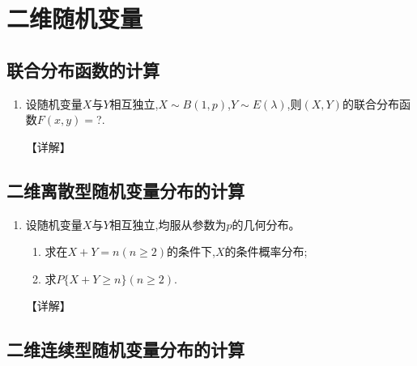 \documentclass[12pt, a4paper, oneside, UTF8]{ctexbook}
\begin{document}
\section{二维随机变量}

\subsection{联合分布函数的计算}

\begin{enumerate}[label=\arabic*.]
    \item 设随机变量$X$与$Y$相互独立,$X\sim B(1,p)$,$Y\sim E(\lambda)$,则$(X,Y)$的联合分布函数$F(x,y)=$?.
    
    \begin{solution}
    【详解】
    \end{solution}
\end{enumerate}

\subsection{二维离散型随机变量分布的计算}

\begin{enumerate}[label=\arabic*.,start=2]
    \item 设随机变量$X$与$Y$相互独立,均服从参数为$p$的几何分布。
    \begin{enumerate}
        \item 求在$X+Y=n(n\geq 2)$的条件下,$X$的条件概率分布;
        \item 求$P\{X+Y\geq n\}(n\geq 2)$.
    \end{enumerate}
    
    \begin{solution}
    【详解】
    \end{solution}
\end{enumerate}

\subsection{二维连续型随机变量分布的计算}
\end{document}
